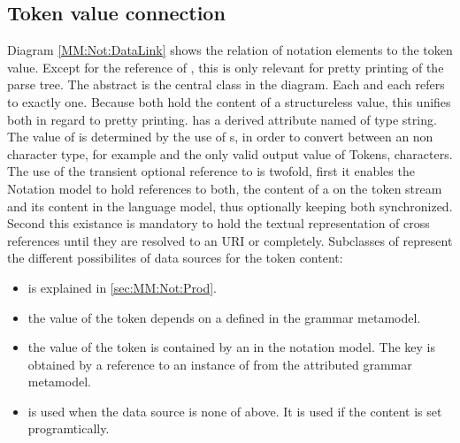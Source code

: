 \subsection{Token value connection}
Diagram \ref{MM:Not:DataLink} shows the relation of notation elements to the token value. Except for the  reference of , this is only relevant for pretty printing of the parse tree. The abstract  is the central class in the diagram. Each  and each  refers to exactly one. Because both hold the content of a structureless value, this unifies both in regard to pretty printing.  has a derived attribute named  of type string. The value of  is determined by the use of s, in order to convert between an non character type, for example  and the only valid output value of Tokens, characters. The use of the transient optional reference to  is twofold, first it enables the Notation model to hold references to both, the content of a  on the token stream and its content in the language model, thus optionally keeping both synchronized. Second this existance is mandatory to hold the textual representation of cross references until they are resolved to an URI or completely. Subclasses of  represent the different possibilites of data sources for the token content:
\begin{itemize}
	\item {} is explained in \ref{sec:MM:Not:Prod}.
	\item {} the value of the token depends on a   defined in the grammar metamodel.
	\item {} the value of the token is contained by an  in the notation model. The key is obtained by a reference to an instance of  from the  attributed grammar metamodel.
	\item {} is used when the data source is none of above. It is used if the content is set programtically.
\end{itemize}


